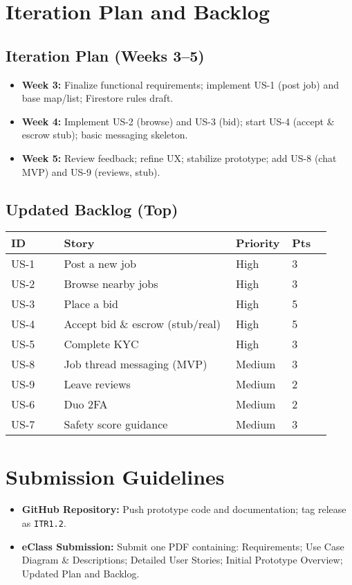 \documentclass[11pt]{article}
\begin{document}
\section{Iteration Plan and Backlog}

\subsection{Iteration Plan (Weeks 3--5)}
\begin{itemize}[leftmargin=1.4em]
  \item \textbf{Week 3:} Finalize functional requirements; implement US-1 (post job) and base map/list; Firestore rules draft.
  \item \textbf{Week 4:} Implement US-2 (browse) and US-3 (bid); start US-4 (accept \& escrow stub); basic messaging skeleton.
  \item \textbf{Week 5:} Review feedback; refine UX; stabilize prototype; add US-8 (chat MVP) and US-9 (reviews, stub).
\end{itemize}

\subsection{Updated Backlog (Top)}
\begin{longtable}{@{}p{0.16\linewidth} p{0.52\linewidth} p{0.12\linewidth} p{0.12\linewidth}@{}}
\toprule
\textbf{ID} & \textbf{Story} & \textbf{Priority} & \textbf{Pts} \\
\midrule
US-1 & Post a new job & High & 3 \\
US-2 & Browse nearby jobs & High & 3 \\
US-3 & Place a bid & High & 5 \\
US-4 & Accept bid \& escrow (stub/real) & High & 5 \\
US-5 & Complete KYC & High & 3 \\
US-8 & Job thread messaging (MVP) & Medium & 3 \\
US-9 & Leave reviews & Medium & 2 \\
US-6 & Duo 2FA & Medium & 2 \\
US-7 & Safety score guidance & Medium & 3 \\
\bottomrule
\end{longtable}

\section{Submission Guidelines}
\begin{itemize}[leftmargin=1.4em]
  \item \textbf{GitHub Repository:} Push prototype code and documentation; tag release as \texttt{ITR1.2}.
  \item \textbf{eClass Submission:} Submit one PDF containing: Requirements; Use Case Diagram \& Descriptions; Detailed User Stories; Initial Prototype Overview; Updated Plan and Backlog.
\end{itemize}
\end{document}
